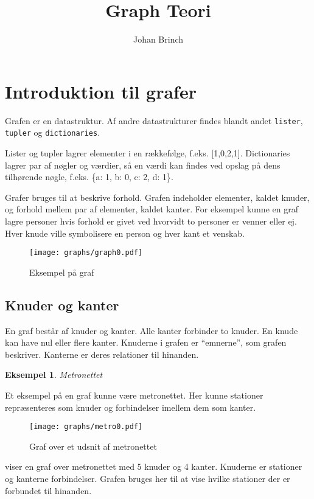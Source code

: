 \documentclass[10pt,a4paper,danish]{article}
\title{Graph Teori}
\author{Johan Brinch}
\newcommand{\ct}{\texttt}
\newtheorem{example}{Eksempel}[subsection]
\begin{document}
\maketitle
\newpage


\tableofcontents
\newpage

\section{Introduktion til grafer}
Grafen er en datastruktur. Af andre datastrukturer findes blandt andet
\ct{lister}, \ct{tupler} og \ct{dictionaries}.

Lister og tupler lagrer elementer i en rækkefølge,
f.eks. [1,0,2,1]. Dictionaries lagrer par af nøgler og værdier, så en
værdi kan findes ved opslag på dens tilhørende nøgle, f.eks. \{a: 1,
b: 0, c: 2, d: 1\}.

Grafer bruges til at beskrive forhold. Grafen indeholder elementer,
kaldet knuder, og forhold mellem par af elementer, kaldet kanter.  For
eksempel kunne en graf lagre personer hvis forhold er givet ved
hvorvidt to personer er venner eller ej. Hver knude ville symbolisere
en person og hver kant et venskab.


\begin{figure}[h]
\centering
\texttt{[image: graphs/graph0.pdf]}
\caption{Eksempel på graf}
\label{fig:graph0}
\end{figure}


\subsection{Knuder og kanter}
En graf består af knuder og kanter. Alle kanter forbinder to
knuder. En knude kan have nul eller flere kanter. Knuderne i grafen er
"`emnerne"', som grafen beskriver. Kanterne er deres relationer til
hinanden.


\begin{example}Metronettet\end{example}
  Et eksempel på en graf kunne være metronettet. Her kunne stationer
  repræsenteres som knuder og forbindelser imellem dem som kanter.

\begin{figure}[h]
\centering
\texttt{[image: graphs/metro0.pdf]}
\caption{Graf over et udsnit af metronettet}
\label{fig:metro0}
\end{figure}

 viser en graf over metronettet med 5 knuder og 4
kanter. Knuderne er stationer og kanterne forbindelser. Grafen bruges
her til at vise hvilke stationer der er forbundet til hinanden.
\end{document}
